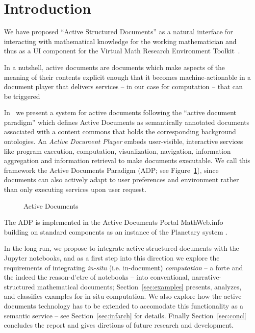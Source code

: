 \section{Introduction}\label{sec:intro}


We have proposed ``Active Structured Documents'' as a natural interface for interacting
with mathematical knowledge for the working mathematician and thus as a UI component for
the \pn Virtual Math Research Environment Toolkit~\cite{ODK-D4.2}.

In a nutshell, active documents are documents which make aspects of the meaning of their
contents explicit enough that it becomes machine-actionable in a document player that
delivers services -- in our case for computation -- that can be triggered 

In~\cite{KohDavGin:psewads11} we present a system for active documents following the
``active document paradigm'' which defines Active Documents as semantically annotated
documents associated with a content commons that holds the corresponding background
ontologies. An \textit{Active Document Player} embeds user-visible, interactive services
like program execution, computation, visualization, navigation, information aggregation
and information retrieval to make documents executable. We call this framework the Active
Documents Paradigm (ADP; see Figure~\ref{fig:activedocs}), since documents can also
actively adapt to user preferences and environment rather than only executing services
upon user request.
\begin{figure}[ht]\centering
  
  \caption{Active Documents}\label{fig:activedocs} 
\end{figure} 

The ADP is implemented in the Active Documents Portal MathWeb.info~\cite{MathHub:on}
building on standard components as an instance of the Planetary system
\cite{Kohlhase:ppte12}.

In the long run, we propose to integrate active structured documents with the Jupyter
notebooks, and as a first step into this direction we explore the requirements of
integrating \emph{in-situ} (i.e. in-document) \emph{computation} -- a forte and the indeed
the reason-d'etre of notebooks -- into conventional, narrative-structured mathematical
documents; Section~\ref{sec:examples} presents, analyzes, and classifies examples for
in-situ computation.  We also explore how the active documents technology has to be
extended to accomodate this functionality as a semantic service -- see
Section~\ref{sec:infarch} for details. Finally Section~\ref{sec:concl} concludes the report
and gives diretions of future research and development.

